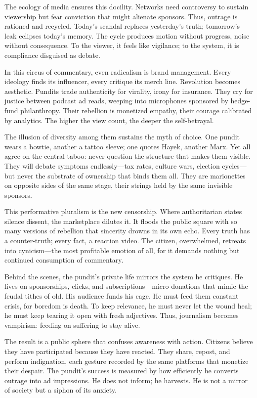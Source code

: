 \documentclass[11pt,twoside]{book}
\begin{document}
The ecology of media ensures this docility.  
Networks need controversy to sustain viewership but fear conviction that might alienate sponsors.  
Thus, outrage is rationed and recycled.  
Today’s scandal replaces yesterday’s truth; tomorrow’s leak eclipses today’s memory.  
The cycle produces motion without progress, noise without consequence.  
To the viewer, it feels like vigilance; to the system, it is compliance disguised as debate.

In this circus of commentary, even radicalism is brand management.  
Every ideology finds its influencer, every critique its merch line.  
Revolution becomes aesthetic.  
Pundits trade authenticity for virality, irony for insurance.  
They cry for justice between podcast ad reads, weeping into microphones sponsored by hedge-fund philanthropy.  
Their rebellion is monetized empathy, their courage calibrated by analytics.  
The higher the view count, the deeper the self-betrayal.

The illusion of diversity among them sustains the myth of choice.  
One pundit wears a bowtie, another a tattoo sleeve; one quotes Hayek, another Marx.  
Yet all agree on the central taboo: never question the structure that makes them visible.  
They will debate symptoms endlessly—tax rates, culture wars, election cycles—but never the substrate of ownership that binds them all.  
They are marionettes on opposite sides of the same stage, their strings held by the same invisible sponsors.

This performative pluralism is the new censorship.  
Where authoritarian states silence dissent, the marketplace dilutes it.  
It floods the public square with so many versions of rebellion that sincerity drowns in its own echo.  
Every truth has a counter-truth; every fact, a reaction video.  
The citizen, overwhelmed, retreats into cynicism—the most profitable emotion of all, for it demands nothing but continued consumption of commentary.

Behind the scenes, the pundit’s private life mirrors the system he critiques.  
He lives on sponsorships, clicks, and subscriptions—micro-donations that mimic the feudal tithes of old.  
His audience funds his cage.  
He must feed them constant crisis, for boredom is death.  
To keep relevance, he must never let the wound heal; he must keep tearing it open with fresh adjectives.  
Thus, journalism becomes vampirism: feeding on suffering to stay alive.

The result is a public sphere that confuses awareness with action.  
Citizens believe they have participated because they have reacted.  
They share, repost, and perform indignation, each gesture recorded by the same platforms that monetize their despair.  
The pundit’s success is measured by how efficiently he converts outrage into ad impressions.  
He does not inform; he harvests.  
He is not a mirror of society but a siphon of its anxiety.
\end{document}
